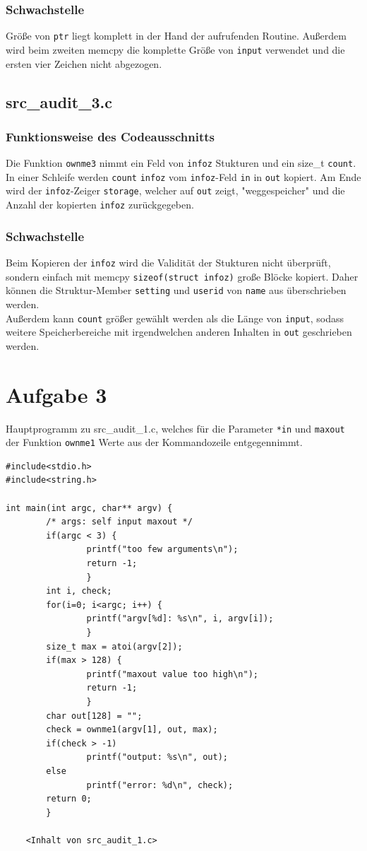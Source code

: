 \documentclass[11pt,a4paper]{article}
\begin{document}
\subsubsection{Schwachstelle}
Größe von \texttt{ptr} liegt komplett in der Hand der aufrufenden Routine. Außerdem wird beim zweiten memcpy die komplette Größe von \texttt{input} verwendet und die ersten vier Zeichen nicht abgezogen.
\subsection{src\_audit\_3.c}
\subsubsection{Funktionsweise des Codeausschnitts}
Die Funktion \texttt{ownme3} nimmt ein Feld von \texttt{infoz} Stukturen und ein size\_t \texttt{count}. In einer Schleife werden \texttt{count} \texttt{infoz} vom \texttt{infoz}-Feld \texttt{in} in \texttt{out} kopiert. Am Ende wird der \texttt{infoz}-Zeiger \texttt{storage}, welcher auf \texttt{out} zeigt, "weggespeicher" und die Anzahl der kopierten \texttt{infoz} zurückgegeben.
\subsubsection{Schwachstelle}
Beim Kopieren der \texttt{infoz} wird die Validität der Stukturen nicht überprüft, sondern einfach mit memcpy \texttt{sizeof(struct infoz)} große Blöcke kopiert. Daher können die Struktur-Member \texttt{setting} und \texttt{userid} von \texttt{name} aus überschrieben werden.\\
Außerdem kann \texttt{count} größer gewählt werden als die Länge von \texttt{input}, sodass weitere Speicherbereiche mit irgendwelchen anderen Inhalten in \texttt{out} geschrieben werden.
\section{Aufgabe 3}
Hauptprogramm zu src\_audit\_1.c, welches für die Parameter \texttt{*in} und \texttt{maxout} der Funktion \texttt{ownme1} Werte aus der Kommandozeile entgegennimmt.
\begin{lstlisting}[frame=single]
#include<stdio.h>
#include<string.h>

int main(int argc, char** argv) {
        /* args: self input maxout */
        if(argc < 3) {
                printf("too few arguments\n");
                return -1;
                }
        int i, check;
        for(i=0; i<argc; i++) {
                printf("argv[%d]: %s\n", i, argv[i]);
                }
        size_t max = atoi(argv[2]);
        if(max > 128) {
                printf("maxout value too high\n");
                return -1;
                }
        char out[128] = "";
        check = ownme1(argv[1], out, max);
        if(check > -1)
                printf("output: %s\n", out);
        else
                printf("error: %d\n", check);
        return 0;
        }

    <Inhalt von src_audit_1.c>

\end{lstlisting}
\end{document}
